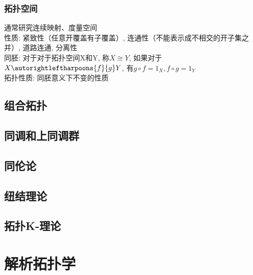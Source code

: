 \documentclass[UTF8]{../09-Mathematics}
\begin{document}
\subsection{拓扑空间}
通常研究连续映射、度量空间\\
性质: 紧致性（任意开覆盖有子覆盖）, 连通性（不能表示成不相交的开子集之并）, 道路连通, 分离性\\
同胚: 对于对于拓扑空间X和Y, 称$X\cong Y$, 如果对于$ X \autorightleftharpoons{f}{g}Y $, 有$ g\circ f =1_X,f\circ g=1_Y $\\
拓扑性质: 同胚意义下不变的性质

 
\begin{comment}
    dsa 
    X \autorightleftharpoons{d969696}{3}Y
    \overset{f}{ \underset{g}{\rightleftharpoons} } 
    \xlongequal[d]{dfafdsf}
    \autorightleftharpoons{f}{g} Z

    \begin{equation}
    \label{homeomorphism}
    \begin{split}
        &\text{if: }X \autorightleftharpoons{f}{g}Y\\
        &\text{where: }g\circ f =1_X,f\circ g=1_Y\\
        &\text{then: }X\cong Y\\
    \end{split}
    \end{equation}

\end{comment}

\section{组合拓扑}
\section{同调和上同调群}
\section{同伦论}
\section{纽结理论}
\section{拓扑K-理论}



\chapter{解析拓扑学}
\end{document}
